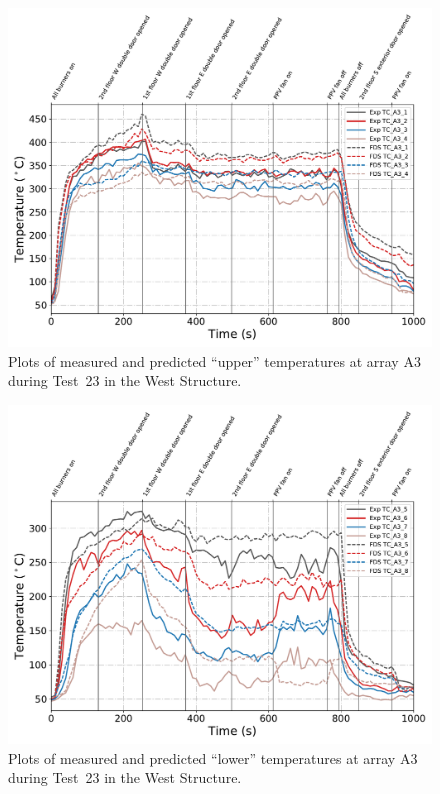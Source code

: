 \begin{figure}[!h]
	\centering
	\includegraphics[width=\columnwidth]{Figures/Plots/Validation/Temperature/Test_23_TC_A3_upper}
	\caption{Plots of measured and predicted ``upper'' temperatures at array A3 during Test~23 in the West Structure.}
	\label{fig:TCA3_upper_data_Test23}
\end{figure}
\begin{figure}[!h]
	\centering
	\includegraphics[width=\columnwidth]{Figures/Plots/Validation/Temperature/Test_23_TC_A3_lower}
	\caption{Plots of measured and predicted ``lower'' temperatures at array A3 during Test~23 in the West Structure.}
	\label{fig:TCA3_lower_data_Test23}
\end{figure}

